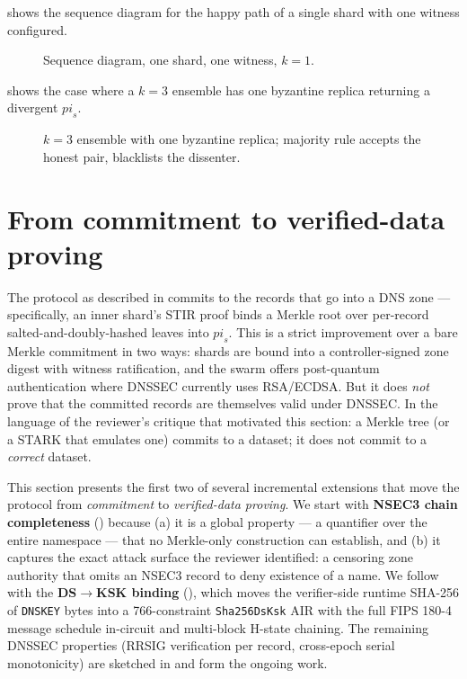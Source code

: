 \documentclass[11pt,a4paper]{article}
\theoremstyle{definition}
\theoremstyle{plain}
\begin{document}
 shows the sequence diagram for the happy path of
a single shard with one witness configured.

\begin{figure}[ht]
  \centering
  
  \caption{Sequence diagram, one shard, one witness, $k = 1$.}
  \label{fig:seq-happy}
\end{figure}

 shows the case where a $k = 3$ ensemble has
one byzantine replica returning a divergent $\mathit{pi}_s$.

\begin{figure}[ht]
  \centering
  
  \caption{$k = 3$ ensemble with one byzantine replica; majority rule
           accepts the honest pair, blacklists the dissenter.}
  \label{fig:seq-byzantine}
\end{figure}

\section{From commitment to verified-data proving}
\label{sec:verified-data}

The protocol as described in  commits to the records
that go into a DNS zone — specifically, an inner shard's STIR proof
binds a Merkle root over per-record salted-and-doubly-hashed leaves into
$\mathit{pi}_s$.  This is a strict improvement over a bare Merkle
commitment in two ways: shards are bound into a controller-signed zone
digest with witness ratification, and the swarm offers post-quantum
authentication where DNSSEC currently uses RSA/ECDSA.  But it does
\emph{not} prove that the committed records are themselves valid under
DNSSEC.  In the language of the reviewer's critique that motivated this
section: a Merkle tree (or a STARK that emulates one) commits to a
dataset; it does not commit to a \emph{correct} dataset.

This section presents the first two of several incremental
extensions that move the protocol from \emph{commitment} to
\emph{verified-data proving}.  We start with \textbf{NSEC3 chain
completeness} () because (a) it is a global
property — a quantifier over the entire namespace — that no
Merkle-only construction can establish, and (b) it captures the
exact attack surface the reviewer identified: a censoring zone
authority that omits an NSEC3 record to deny existence of a name.
We follow with the \textbf{DS$\to$KSK binding}
(), which moves the verifier-side runtime
SHA-256 of \texttt{DNSKEY} bytes into a 766-constraint
\texttt{Sha256DsKsk} AIR with the full FIPS 180-4 message schedule
in-circuit and multi-block H-state chaining.  The remaining DNSSEC
properties (RRSIG verification per record, cross-epoch serial
monotonicity) are sketched in  and form
the ongoing work.
\end{document}
